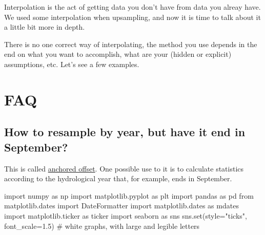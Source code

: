 \documentclass[
  letterpaper,
  DIV=11,
  numbers=noendperiod,
  oneside]{scrreprt}
\newenvironment{Shaded}{\begin{snugshade}}{\end{snugshade}}
\newcommand{\BuiltInTok}[1]{\textcolor[rgb]{0.00,0.23,0.31}{#1}}
\newcommand{\CommentTok}[1]{\textcolor[rgb]{0.37,0.37,0.37}{#1}}
\newcommand{\FloatTok}[1]{\textcolor[rgb]{0.68,0.00,0.00}{#1}}
\newcommand{\ImportTok}[1]{\textcolor[rgb]{0.00,0.46,0.62}{#1}}
\newcommand{\NormalTok}[1]{\textcolor[rgb]{0.00,0.23,0.31}{#1}}
\newcommand{\OperatorTok}[1]{\textcolor[rgb]{0.37,0.37,0.37}{#1}}
\newcommand{\StringTok}[1]{\textcolor[rgb]{0.13,0.47,0.30}{#1}}
\begin{document}
Interpolation is the act of getting data you don't have from data you
alreay have. We used some interpolation when upsampling, and now it is
time to talk about it a little bit more in depth.

There is no one correct way of interpolating, the method you use depends
in the end on what you want to accomplish, what are your (hidden or
explicit) assumptions, etc. Let's see a few examples.

\hypertarget{faq}{%
\chapter{FAQ}\label{faq}}

\hypertarget{how-to-resample-by-year-but-have-it-end-in-september}{%
\section{How to resample by year, but have it end in
September?}\label{how-to-resample-by-year-but-have-it-end-in-september}}

This is called
\href{https://pandas.pydata.org/pandas-docs/stable/user_guide/timeseries.html\#anchored-offsets}{anchored
offset}. One possible use to it is to calculate statistics according to
the hydrological year that, for example, ends in September.

\begin{Shaded}
\begin{Highlighting}[]
\ImportTok{import}\NormalTok{ numpy }\ImportTok{as}\NormalTok{ np}
\ImportTok{import}\NormalTok{ matplotlib.pyplot }\ImportTok{as}\NormalTok{ plt}
\ImportTok{import}\NormalTok{ pandas }\ImportTok{as}\NormalTok{ pd}
\ImportTok{from}\NormalTok{ matplotlib.dates }\ImportTok{import}\NormalTok{ DateFormatter}
\ImportTok{import}\NormalTok{ matplotlib.dates }\ImportTok{as}\NormalTok{ mdates}
\ImportTok{import}\NormalTok{ matplotlib.ticker }\ImportTok{as}\NormalTok{ ticker}
\ImportTok{import}\NormalTok{ seaborn }\ImportTok{as}\NormalTok{ sns}
\NormalTok{sns.}\BuiltInTok{set}\NormalTok{(style}\OperatorTok{=}\StringTok{"ticks"}\NormalTok{, font\_scale}\OperatorTok{=}\FloatTok{1.5}\NormalTok{)  }\CommentTok{\# white graphs, with large and legible letters}
\end{Highlighting}
\end{Shaded}
\end{document}
